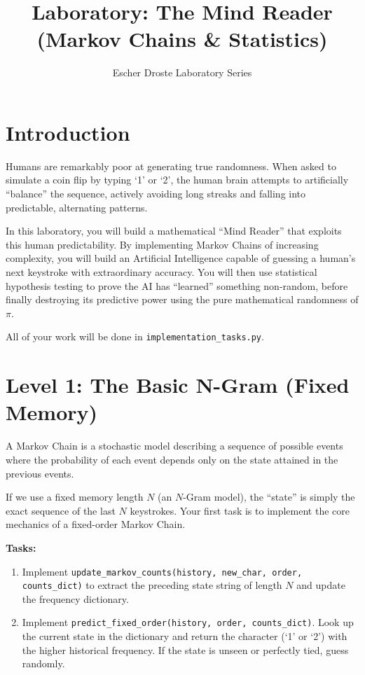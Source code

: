 \documentclass[12pt]{article}
\title{Laboratory: The Mind Reader (Markov Chains \& Statistics)}
\author{Escher Droste Laboratory Series}
\date{}
\begin{document}
\maketitle

\section*{Introduction}
Humans are remarkably poor at generating true randomness. When asked to simulate a coin flip by typing `1' or `2', the human brain attempts to artificially ``balance'' the sequence, actively avoiding long streaks and falling into predictable, alternating patterns.

In this laboratory, you will build a mathematical ``Mind Reader'' that exploits this human predictability. By implementing Markov Chains of increasing complexity, you will build an Artificial Intelligence capable of guessing a human's next keystroke with extraordinary accuracy. You will then use statistical hypothesis testing to prove the AI has ``learned'' something non-random, before finally destroying its predictive power using the pure mathematical randomness of $\pi$.

All of your work will be done in \texttt{implementation\_tasks.py}.

\section{Level 1: The Basic N-Gram (Fixed Memory)}
A Markov Chain is a stochastic model describing a sequence of possible events where the probability of each event depends only on the state attained in the previous events.

If we use a fixed memory length $N$ (an $N$-Gram model), the ``state'' is simply the exact sequence of the last $N$ keystrokes.
Your first task is to implement the core mechanics of a fixed-order Markov Chain.

\textbf{Tasks:}
\begin{enumerate}
    \item Implement \texttt{update\_markov\_counts(history, new\_char, order, counts\_dict)} to extract the preceding state string of length $N$ and update the frequency dictionary.
    \item Implement \texttt{predict\_fixed\_order(history, order, counts\_dict)}. Look up the current state in the dictionary and return the character (`1' or `2') with the higher historical frequency. If the state is unseen or perfectly tied, guess randomly.
\end{enumerate}
\end{document}
